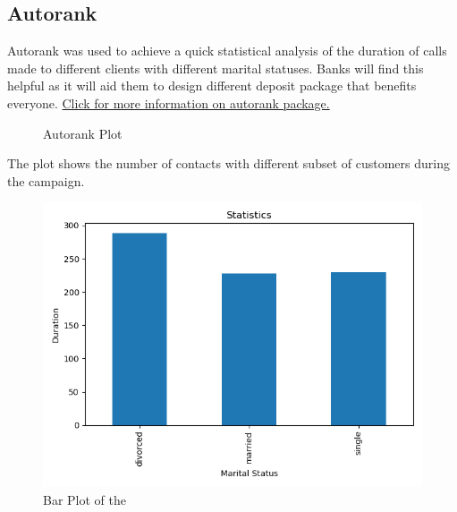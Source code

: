 \documentclass[12pt]{article}
\begin{document}
\subsection{Autorank}
Autorank was used to achieve a quick statistical analysis of the duration of calls made to different clients with different marital statuses. Banks will find this helpful as it will aid them to design different deposit package that benefits everyone.
 \href{https://pypi.org/project/autorank/#description}{Click for more information on autorank package.} 

\begin{figure}[!htbp]
	\centering
{}
	\caption{Autorank Plot}
\end{figure}
\newpage
The plot shows the number of contacts with different subset of customers during the campaign.
\begin{figure}[!htbp]
	\centering
	\includegraphics[width=15 cm]{mean.png}
	\caption{Bar Plot of the }
\end{figure}
\end{document}
